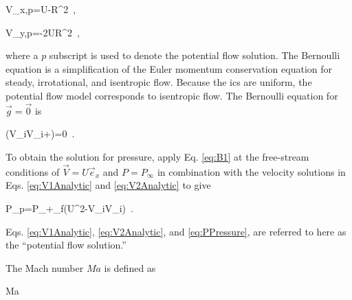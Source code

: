 \beq
\label{eq:V1Analytic}
V_{x,p}=U\left{}-R^2\right\rbrack\ ,
\eeq

\beq
\label{eq:V2Analytic}
V_{y,p}=-2UR^2\ ,
\eeq

\noindent where a \(p\) subscript is used to denote the potential flow solution. The Bernoulli equation is a simplification of the Euler momentum conservation equation for steady, irrotational, and isentropic flow. Because the \glspl{ic} are uniform, the potential flow model corresponds to isentropic flow. The Bernoulli equation for \(\vec{g}=\vec{0}\) is

\beq
\label{eq:B1}
\nabla\left(V_iV_i+\right)=0\ .
\eeq

\noindent To obtain the solution for pressure, apply Eq. \eqref{eq:B1} at the free-stream conditions of \(\vec{V}=U\vec{e}_x\) and \(P=P_\infty\) in combination with the velocity solutions in Eqs. \eqref{eq:V1Analytic} and \eqref{eq:V2Analytic} to give

\beq
\label{eq:PPressure}
P_p=P_\infty+\rho_f\left(U^2-V_iV_i\right)\ .
\eeq

\noindent Eqs. \eqref{eq:V1Analytic}, \eqref{eq:V2Analytic}, and \eqref{eq:PPressure}, are referred to here as the ``potential flow solution.''

The Mach number \(Ma\) is defined as

\beq
\label{eq:MaDef}
Ma\equiv{}\ 
\eeq


